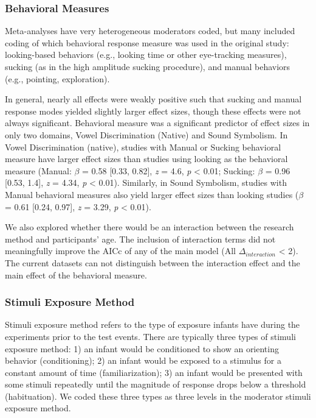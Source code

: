\documentclass[10pt, letterpaper]{article}
\begin{document}
\hypertarget{behavioral-measures}{%
\subsubsection{Behavioral Measures}\label{behavioral-measures}}

Meta-analyses have very heterogeneous moderators coded, but many
included coding of which behavioral response measure was used in the
original study: looking-based behaviors (e.g., looking time or other
eye-tracking measures), sucking (as in the high amplitude sucking
procedure), and manual behaviors (e.g., pointing, exploration).

In general, nearly all effects were weakly positive such that sucking
and manual response modes yielded slightly larger effect sizes, though
these effects were not always significant. Behavioral measure was a
significant predictor of effect sizes in only two domains, Vowel
Discrimination (Native) and Sound Symbolism. In Vowel Discrimination
(native), studies with Manual or Sucking behavioral measure have larger
effect sizes than studies using looking as the behavioral measure
(Manual: \(\beta\) = 0.58 {[}0.33, 0.82{]}, \emph{z} = 4.6, \emph{p}
\textless{} 0.01; Sucking: \(\beta\) = 0.96 {[}0.53, 1.4{]}, \emph{z} =
4.34, \emph{p} \textless{} 0.01). Similarly, in Sound Symbolism, studies
with Manual behavioral measures also yield larger effect sizes than
looking studies (\(\beta\) = 0.61 {[}0.24, 0.97{]}, \emph{z} = 3.29,
\emph{p} \textless{} 0.01).

We also explored whether there would be an interaction between the
research method and participants' age. The inclusion of interaction
terms did not meaningfully improve the AICc of any of the main model
(All \(\Delta_{interaction}\) \textless{} 2). The current datasets can
not distinguish between the interaction effect and the main effect of
the behavioral measure.

\hypertarget{stimuli-exposure-method}{%
\subsubsection{Stimuli Exposure Method}\label{stimuli-exposure-method}}

Stimuli exposure method refers to the type of exposure infants have
during the experiments prior to the test events. There are typically
three types of stimuli exposure method: 1) an infant would be
conditioned to show an orienting behavior (conditioning); 2) an infant
would be exposed to a stimulus for a constant amount of time
(familiarization); 3) an infant would be presented with some stimuli
repeatedly until the magnitude of response drops below a threshold
(habituation). We coded these three types as three levels in the
moderator stimuli exposure method.
\end{document}
